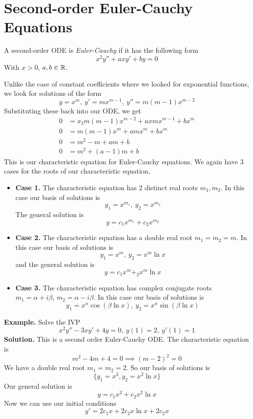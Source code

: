 \documentclass[openany]{report}
\begin{document}
\section{Second-order Euler-Cauchy Equations}
\begin{definition}
    A second-order ODE is \emph{Euler-Cauchy} if it has the following form
    \[x^2y'' + axy' + by = 0\]
    With $x >0$, $a,b \in \mathbb{R}$.
\end{definition}
Unlike the case of constant coefficients where we looked for exponential functions, we look for solutions of the form
\[y = x^m, \ y' = mx^{m-1}, \ y'' = m(m-1)x^{m-2} \]
Substituting these back into our ODE, we get
\begin{align*}
    0 &= x_2m(m-1)x^{m-2} + axmx^{m-1} + bx^m\\
    0 &= m(m-1)x^m + amx^m + bx^m \\
    0 &= m^2 - m + am + b \\
    0 &= m^2 + (a-1)m + b 
\end{align*}
This is our characteristic equation for Euler-Cauchy equations. We again have 3 cases for the roots of our characteristic equation,
\begin{itemize}
    \item \textbf{Case 1.} The characteristic equation has 2 distinct real roots $m_1, m_2$. In this case our basis of solutions is
    \[y_1 = x^{m_1}, \ y_2 = x^{m_2}\]
    The general solution is
    \[y = c_1x^{m_1} + c_2x^{m_2}\]
    \item \textbf{Case 2.} The characteristic equation has a double real root $m_1 = m_2 = m$. In this case our basis of solutions is
    \[y_1 = x^m, \ y_2 = x^m\ln x\]
    and the general solution is
    \[y = c_1x^m +_2x^m\ln x\]

    \item \textbf{Case 3.} The characteristic equation has complex conjugate roots $m_1 = \alpha + i\beta$, $m_2 = \alpha - i\beta$. In this case our basis of solutions is
    \[y_1 = x^\alpha\cos(\beta\ln x), \ y_2 = x^\alpha \sin(\beta\ln x)\]
\end{itemize}
\noindent
\textbf{Example.} Solve the IVP
\[x^2y'' - 3xy' + 4y = 0, \ y(1) = 2, \ y'(1) = 1\]
\textbf{Solution.} This is a second order Euler-Cauchy ODE. The characteristic equation is
\[m^2 - 4m + 4 = 0 \implies (m-2)^2 = 0\] 
We have a double real root $m_1 = m_2 = 2$. So our basis of solutions is
\[\{y_1 = x^2, y_2 = x^2\ln x\}\]
Our general solution is 
\[y = c_1x^2 + c_2x^2\ln x\]
Now we can use our initial conditions
\[y' = 2c_1x + 2c_2x\ln x + 2c_2x\]
\end{document}
